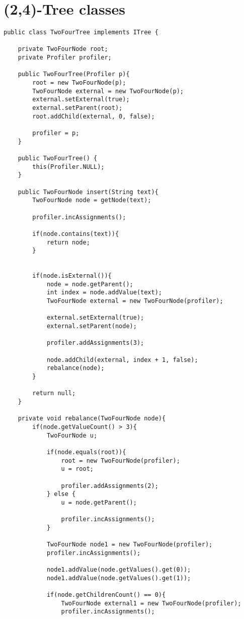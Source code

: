 \chapter{(2,4)-Tree classes}
\lstset{language=Java}
\begin{lstlisting}[caption=TwoFourTree classes Source code - TwoFourTree]
public class TwoFourTree implements ITree {

	private TwoFourNode root;
	private Profiler profiler;
	
	public TwoFourTree(Profiler p){
		root = new TwoFourNode(p);
		TwoFourNode external = new TwoFourNode(p);
		external.setExternal(true);
		external.setParent(root);
		root.addChild(external, 0, false);
		
		profiler = p;
	}
	
	public TwoFourTree() {
		this(Profiler.NULL);
	}
	
	public TwoFourNode insert(String text){
		TwoFourNode node = getNode(text);
		
		profiler.incAssignments();
		
		if(node.contains(text)){
			return node;
		}
		
		
		if(node.isExternal()){
			node = node.getParent();
			int index = node.addValue(text);
			TwoFourNode external = new TwoFourNode(profiler);
			
			external.setExternal(true);
			external.setParent(node);
			
			profiler.addAssignments(3);
			
			node.addChild(external, index + 1, false);
			rebalance(node);
		}
		
		return null;
	}
	
	private void rebalance(TwoFourNode node){
		if(node.getValueCount() > 3){
			TwoFourNode u;
			
			if(node.equals(root)){
				root = new TwoFourNode(profiler);
				u = root;
				
				profiler.addAssignments(2);
			} else {
				u = node.getParent();
				
				profiler.incAssignments();
			}
			
			TwoFourNode node1 = new TwoFourNode(profiler);
			profiler.incAssignments();
			
			node1.addValue(node.getValues().get(0));
			node1.addValue(node.getValues().get(1));
			
			if(node.getChildrenCount() == 0){
				TwoFourNode external1 = new TwoFourNode(profiler);
				profiler.incAssignments();
				

\end{lstlisting}
